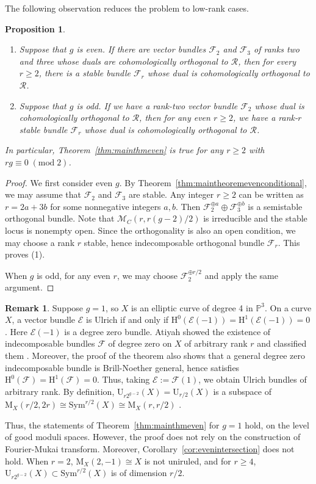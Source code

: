 \documentclass[12pt, letterpaper]{amsart}
\newtheorem{proposition}[theorem]{Proposition}
\theoremstyle{definition}
\newtheorem{remark}[theorem]{Remark}
\newcommand{\PP}{\mathbb{P} }
\newcommand{\cE}{\mathcal{E} }
\newcommand{\cF}{\mathcal{F} }
\newcommand{\cM}{\mathcal{M} }
\newcommand{\cR}{\mathcal{R} }
\newcommand{\rH}{\mathrm{H} }
\newcommand{\rM}{\mathrm{M} }
\newcommand{\rU}{\mathrm{U} }
\def\sym{\mathrm{Sym}}
\begin{document}
The following observation reduces the problem to low-rank cases.

\begin{proposition}\label{prop:lowrankisenougheven}
\begin{enumerate}
  \item Suppose that \(g\) is even. If there are vector bundles \(\cF_2\) and \(\cF_3\) of ranks two and three whose duals are cohomologically orthogonal to \(\cR\), then for every \(r \ge 2\), there is a stable bundle \(\cF_r\) whose dual is cohomologically orthogonal to \(\cR\).
  \item Suppose that \(g\) is odd. If we have a rank-two vector bundle \(\cF_2\) whose dual is cohomologically orthogonal to \(\cR\), then for any even \(r \ge 2\), we have a rank-\(r\) stable bundle \(\cF_r\) whose dual is cohomologically orthogonal to \(\cR\).
\end{enumerate}
In particular, Theorem~\ref{thm:mainthmeven} is true for any \(r \ge 2\) with \(rg \equiv 0 \;(\mathrm{mod}\; 2)\).
\end{proposition}

\begin{proof}
We first consider even \(g\). By Theorem~\ref{thm:maintheoremevenconditional}, we may assume that \(\cF_2\) and \(\cF_3\) are stable. Any integer \(r \ge 2\) can be written as \(r = 2a + 3b\) for some nonnegative integers \(a, b\). Then \(\cF_2^{\oplus a}\oplus \cF_3^{\oplus b}\) is a semistable orthogonal bundle. Note that \(\cM_C(r, r(g-2)/2)\) is irreducible and the stable locus is nonempty open. Since the orthogonality is also an open condition, we may choose a rank \(r\) stable, hence indecomposable orthogonal bundle \(\cF_r\). This proves (1).

When \(g\) is odd, for any even \(r\), we may choose \(\cF_2^{\oplus r/2}\) and apply the same argument.
\end{proof}

\begin{remark}\label{rmk:genus1}
Suppose \(g = 1\), so \(X\) is an elliptic curve of degree 4 in \(\PP^3\). On a curve \(X\), a vector bundle \(\cE\) is Ulrich if and only if \(\rH^0(\cE(-1)) = \rH^1(\cE(-1)) = 0\). Here \(\cE(-1)\) is a degree zero bundle. Atiyah showed the existence of indecomposable bundles \(\cF\) of degree zero on \(X\) of arbitrary rank \(r\) and classified them \cite[Theorem~5]{Ati57}. Moreover, the proof of the theorem also shows that a general degree zero indecomposable bundle is Brill-Noether general, hence satisfies \(\rH^0(\cF) = \rH^1(\cF) = 0\). Thus, taking \(\cE := \cF(1)\), we obtain Ulrich bundles of arbitrary rank. By definition, \(\rU_{r2^{g-2}}(X) = \rU_{r/2}(X)\) is a subspace of \(\rM_X(r/2, 2r) \cong \sym^{r/2}(X) \cong \rM_X(r, r/2)\) \cite[Theorem~1]{Tu93}.

Thus, the statements of Theorem~\ref{thm:mainthmeven} for \(g = 1\) hold, on the level of good moduli spaces. However, the proof does not rely on the construction of Fourier-Mukai transform. Moreover, Corollary~\ref{cor:evenintersection} does not hold. When \(r = 2\), \(\rM_X(2, -1) \cong X\) is not uniruled, and for \(r \ge 4\), \(\rU_{r2^{g-2}}(X)\subset \sym^{r/2}(X)\) is of dimension \(r/2\).
\end{remark}
\end{document}

